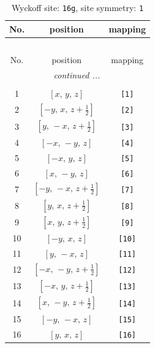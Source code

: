 \documentclass[fleqn,8pt]{jsarticle}
\begin{document}
\begin{longtable}{ccc}
\caption{Wyckoff site: {\tt 16g}, site symmetry: {\tt 1}}
 \\
 \hline \hline
No. & position & mapping \\ \hline \endfirsthead

\multicolumn{2}{l}{\tablename\ \thetable{}} \\
 \hline \hline
No. & position & mapping \\ \hline \endhead

 \hline \hline
\multicolumn{2}{r}{\footnotesize\it continued ...} \\ \endfoot

 \hline \hline
\multicolumn{2}{r}{} \\ \endlastfoot

1 & $\left[ x,\, y,\, z \right]$ & {\tt [1]} \\ \hline
2 & $\left[ - y,\, x,\, z + \frac{1}{2} \right]$ & {\tt [2]} \\ \hline
3 & $\left[ y,\, - x,\, z + \frac{1}{2} \right]$ & {\tt [3]} \\ \hline
4 & $\left[ - x,\, - y,\, z \right]$ & {\tt [4]} \\ \hline
5 & $\left[ - x,\, y,\, z \right]$ & {\tt [5]} \\ \hline
6 & $\left[ x,\, - y,\, z \right]$ & {\tt [6]} \\ \hline
7 & $\left[ - y,\, - x,\, z + \frac{1}{2} \right]$ & {\tt [7]} \\ \hline
8 & $\left[ y,\, x,\, z + \frac{1}{2} \right]$ & {\tt [8]} \\ \hline
9 & $\left[ x,\, y,\, z + \frac{1}{2} \right]$ & {\tt [9]} \\ \hline
10 & $\left[ - y,\, x,\, z \right]$ & {\tt [10]} \\ \hline
11 & $\left[ y,\, - x,\, z \right]$ & {\tt [11]} \\ \hline
12 & $\left[ - x,\, - y,\, z + \frac{1}{2} \right]$ & {\tt [12]} \\ \hline
13 & $\left[ - x,\, y,\, z + \frac{1}{2} \right]$ & {\tt [13]} \\ \hline
14 & $\left[ x,\, - y,\, z + \frac{1}{2} \right]$ & {\tt [14]} \\ \hline
15 & $\left[ - y,\, - x,\, z \right]$ & {\tt [15]} \\ \hline
16 & $\left[ y,\, x,\, z \right]$ & {\tt [16]} \\
\end{longtable}
\end{document}

